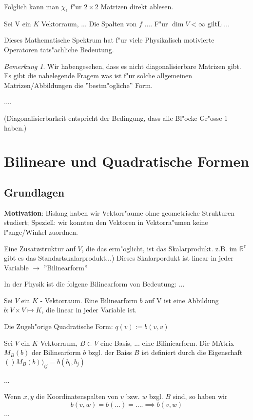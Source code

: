 \documentclass[fontsize=11pt,paper=a4,BCOR=0mm,DIV=11,automark,headsepline]{scrbook}
\theoremstyle{remark}
\theoremstyle{definition}
\theoremstyle{proof}
\theoremstyle{remark}
\newtheorem*{bem}{Bemerkung}
\begin{document}
Folglich kann man $\chi_1$ f"ur $2\times 2$ Matrizen direkt ablesen.

\begin{definition}
  Sei V ein $K$ Vektorraum, ... Die Spalten von $f$ .... F"ur $\dim V < \infty$
  giltL ... 
\end{definition}
Dieses Mathematische Spektrum hat f"ur viele Physikalisch motivierte Operatoren
tats"achliche Bedeutung.

\begin{bem}
  Wir habengesehen, dass es nicht diagonalisierbare Matrizen gibt. Es gibt die
  nahelegende Fragem was ist f"ur solche allgemeinen Matrizen/Abbildungen die
  ''bestm"ogliche'' Form.
\end{bem}
\begin{relation}
  ....

  (Diagonalisierbarkeit entspricht der Bedingung, dass  alle Bl"ocke Gr"osse 1 haben.)
\end{relation}

\part{Bilineare und Quadratische Formen}
\chapter{Grundlagen}
\label{sec:bili}
\textbf{Motivation}: Bislang haben wir Vektorr"aume ohne geometrische Strukturen
studiert; Speziell: wir konnten den Vektoren in Vektorra"umen keine
l"ange/Winkel zuordnen.

Eine Zusatzstruktur auf $V$, die das erm"oglicht, ist das Skalarprodukt. z.B.
im $\mathbb{R^n}$ gibt es das Standartskalarprodukt...) Dieses Skalarpordukt ist
linear in jeder Variable $\rightarrow$ ''Bilinearform''

In der Physik ist die folgene Bilinearform von Bedeutung: ...

\begin{definition}
  Sei $V$ ein $K$ - Vektorraum. Eine Bilinearform $b$ auf V ist eine Abbildung
  $b: V\times V \mapsto K$, die linear in jeder Variable ist.

  Die Zugeh"orige Quadratische Form: $q(v):=b(v,v)$
\end{definition}



\begin{definition}
  Sei $V$ ein $K$-Vektorraum, $B\subset V$ eine Basis, ... eine Biliniearform.
  Die MAtrix $M_B(b)$ der Bilinearform $b$ bzgl. der Baiss $B$ ist definiert
  durch die Eigenschaft $()M_B(b))_{ij}=b(b_i, b_j)$
\end{definition}
\begin{exa}
  ...
\end{exa}
Wenn $x,y$ die Koordinatenspalten von $v$ bzw. $w$ bzgl. $B$ sind, so haben wir
\[b(v,w)=b(...)=.... \implies b(v,w)\] ...
\end{document}
